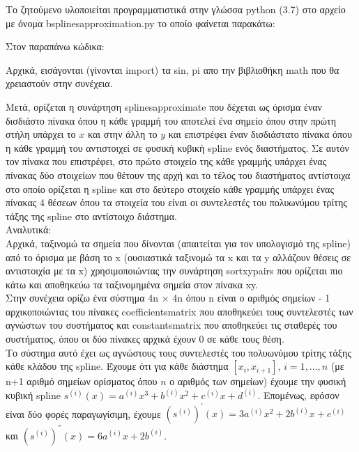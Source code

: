 \documentclass[a4paper,11pt]{article}
\newcommand{\lt}{\latintext}
\newcommand{\gt}{\greektext}
\begin{document}
Το ζητούμενο υλοποιείται προγραμματιστικά στην γλώσσα {\lt python} (3.7) στο αρχείο με όνομα {\lt b\textunderscore splines\textunderscore approximation.py} το οποίο φαίνεται παρακάτω:
\lt

\gt

\par
Στον παραπάνω κώδικα:\\
\par
Αρχικά, εισάγονται (γίνονται {\lt import}) τα {\lt sin, pi} απο την βιβλιοθήκη {\lt math} που θα χρειαστούν στην συνέχεια.\\

\par
Μετά, ορίζεται η συνάρτηση {\lt splines\textunderscore approximate} που δέχεται ως όρισμα έναν δισδιάστο πίνακα όπου η κάθε γραμμή του αποτελεί ένα σημείο όπου στην πρώτη στήλη υπάρχει το {\lt $x$} και στην άλλη το {\lt $y$} και επιστρέφει
έναν δισδιάστατο πίνακα όπου η κάθε γραμμή του αντιστοιχεί σε φυσική κυβική {\lt spline} ενός διαστήματος. Σε αυτόν τον πίνακα που επιστρέφει, στο πρώτο στοιχείο της κάθε γραμμής υπάρχει ένας πίνακας δύο στοιχείων που θέτουν της αρχή και το τέλος του διαστήματος αντίστοιχα στο οποίο ορίζεται η {\lt spline} και στο δεύτερο στοιχείο κάθε γραμμής υπάρχει ένας πίνακας 4 θέσεων όπου τα στοιχεία του είναι οι συντελεστές του πολυωνύμου τρίτης τάξης της {\lt spline} στο αντίστοιχο διάστημα.\\
Αναλυτικά:\\
Αρχικά, ταξινομώ τα σημεία που δίνονται (απαιτείται για τον υπολογισμό της {\lt spline}) από το όρισμα με βάση το {\lt x} (ουσιαστικά ταξινομώ τα {\lt x} και τα {\lt y} αλλάζουν θέσεις σε αντιστοιχία με τα {\lt x}) χρησιμοποιώντας την συνάρτηση {\lt sort\textunderscore xy\textunderscore pairs} που ορίζεται πιο κάτω και αποθηκεύω τα ταξινομημένα σημεία στον πίνακα {\lt x\textunderscore y}.\\
Στην συνέχεια ορίζω ένα σύστημα {\lt 4n $\times$ 4n} όπου {\lt n} είναι ο αριθμός σημείων - 1 αρχικοποιώντας του πίνακες  
{\lt coefficients\textunderscore matrix} που αποθηκεύει τους συντελεστές των αγνώστων του συστήματος και {\lt constants\textunderscore matrix} που αποθηκεύει τις σταθερές του συστήματος, όπου οι δύο πίνακες αρχικά έχουν 0 σε κάθε τους θέση.\\
Το σύστημα αυτό έχει ως αγνώστους τους συντελεστές του πολυωνύμου τρίτης τάξης κάθε κλάδου της {\lt spline}. Έχουμε ότι για κάθε διάστημα {\lt $[x_i, x_{i+1}]$, $i = 1, ..., n$} (με {\lt n}+1 αριθμό σημείων ορίσματος όπου {\lt $n$} ο αριθμός των σημείων) έχουμε την φυσική κυβική {\lt spline} {\lt $s^{(i)}(x) = a^{(i)}x^3 + b^{(i)}x^2 + c^{(i)}x + d^{(i)}$}. Επομένως, εφόσον είναι δύο φορές παραγωγίσιμη, έχουμε {\lt $(s^{(i)})^{'}(x) = 3a^{(i)}x^2 + 2b^{(i)}x + c^{(i)}$} και {\lt $(s^{(i)})^{''}(x) = 6a^{(i)}x + 2b^{(i)} $}.
\end{document}
